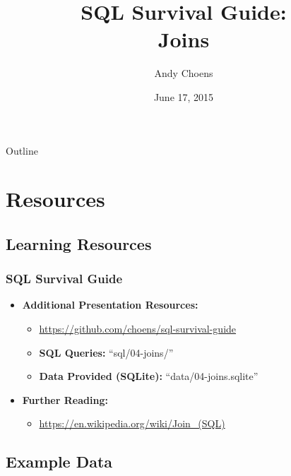 \documentclass{beamer}
\title[SQL Survival Guide]{SQL Survival Guide:\\Joins}
\author{Andy Choens}
\institute{EBCoP}
\date{June 17, 2015}
\begin{document}
\begin{frame} %
  \titlepage{}
\end{frame}

\begin{frame}{Outline} %
  \tableofcontents
\end{frame}



\section{Resources} %

\subsection{Learning Resources} %

\begin{frame} %
  \frametitle{SQL Survival Guide}

  \begin{itemize}
  \item \textbf{Additional Presentation Resources:}
    \begin{itemize}
    \item \url{https://github.com/choens/sql-survival-guide}
    \item \textbf{SQL Queries:} ``sql/04-joins/''
    \item \textbf{Data Provided (SQLite):} ``data/04-joins.sqlite''
    \end{itemize}
  \item \textbf{Further Reading:}
    \begin{itemize}
    \item \url{https://en.wikipedia.org/wiki/Join\_(SQL)}
    \end{itemize}
  \end{itemize}
  
\end{frame}

\subsection{Example Data} %
\end{document}
